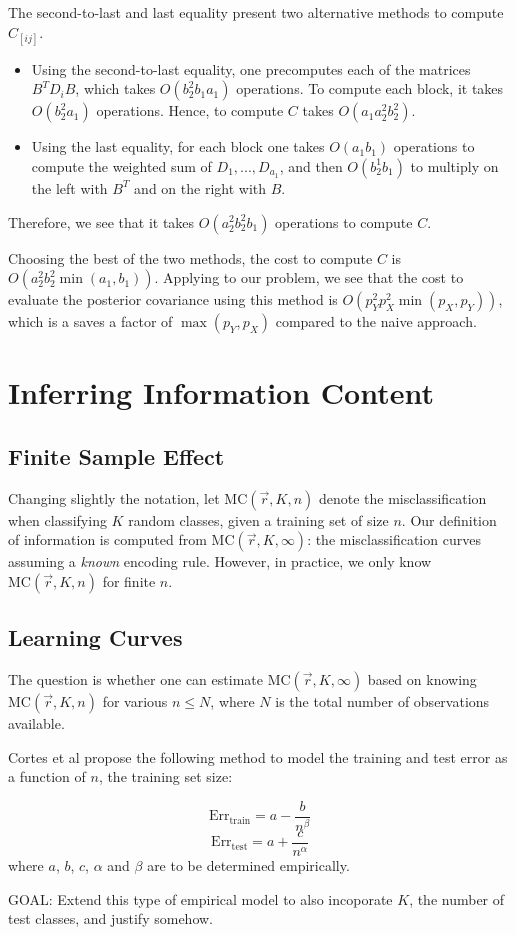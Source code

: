 \documentclass[12pt]{article}
\begin{document}
The second-to-last and last equality present two alternative methods to compute $C_{[ij]}$.

\begin{itemize}
\item Using the second-to-last equality, one precomputes each of the matrices $B^T D_i B$, which takes $O(b_2^2 b_1 a_1)$ operations.  To compute each block, it takes $O(b_2^2 a_1)$ operations.  Hence, to compute $C$ takes $O(a_1 a_2^2 b_2^2)$.
\item Using the last equality, for each block one takes $O(a_1 b_1)$ operations to compute the weighted sum of $D_1,..., D_{a_1}$, and then $O(b_2^1 b_1)$ to multiply on the left with $B^T$ and on the right with $B$.
\end{itemize}
Therefore, we see that it takes $O(a_2^2 b_2^2 b_1)$ operations to compute $C$.

Choosing the best of the two methods, the cost to compute $C$ is $O(a_2^2 b_2^2 \min(a_1, b_1))$.
Applying to our problem, we see that the cost to evaluate the posterior covariance using this method is $O(p_Y^2 p_X^2 \min(p_X, p_Y))$, which is a saves a factor of $\max(p_Y, p_X)$ compared to the naive approach.


\section{Inferring Information Content}

\subsection{Finite Sample Effect}

Changing slightly the notation, let $\text{MC}(\vec{r}, K, n)$ denote
the misclassification when classifying $K$ random classes, given a
training set of size $n$.  Our definition of information is computed
from $\text{MC}(\vec{r}, K, \infty)$: the misclassification curves
assuming a \emph{known} encoding rule.  However, in practice, we only
know $\text{MC}(\vec{r}, K, n)$ for finite $n$.

\subsection{Learning Curves}

The question is whether one can estimate $\text{MC}(\vec{r},
K, \infty)$ based on knowing $\text{MC}(\vec{r}, K, n)$ for various
$n \leq N$, where $N$ is the total number of observations available.

Cortes et al propose the following method to model the training and
test error as a function of $n$, the training set size:

\[
\text{Err}_{\text{train}} = a - \frac{b}{n^\beta}
\]
\[
\text{Err}_{\text{test}} = a + \frac{c}{n^\alpha}
\]
where $a$, $b$, $c$, $\alpha$ and $\beta$ are to be determined
empirically.

GOAL: Extend this type of empirical model to also incoporate $K$, the
number of test classes, and justify somehow.
\end{document}
